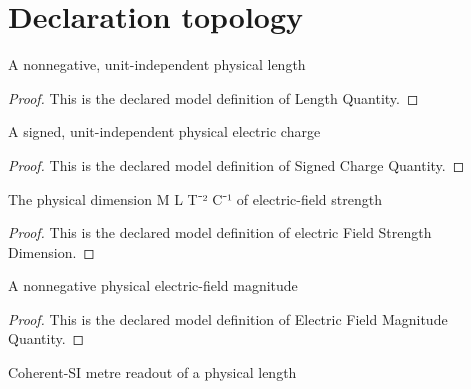 \section{Declaration topology}
\begin{definition}
  \label{def:physics:phyx-mini-0834:phyxminiproblems-problemphyxmini0834-lengthquantity}
  A nonnegative, unit-independent physical length
\end{definition}
\begin{proof}
  This is the declared model definition of Length Quantity.
\end{proof}
\begin{definition}
  \label{def:physics:phyx-mini-0834:phyxminiproblems-problemphyxmini0834-signedchargequantity}
  A signed, unit-independent physical electric charge
\end{definition}
\begin{proof}
  This is the declared model definition of Signed Charge Quantity.
\end{proof}
\begin{definition}
  \label{def:physics:phyx-mini-0834:phyxminiproblems-problemphyxmini0834-electricfieldstrengthdimension}
  The physical dimension M L T⁻² C⁻¹ of electric-field strength
\end{definition}
\begin{proof}
  This is the declared model definition of electric Field Strength Dimension.
\end{proof}
\begin{definition}
  \label{def:physics:phyx-mini-0834:phyxminiproblems-problemphyxmini0834-electricfieldmagnitudequantity}
  A nonnegative physical electric-field magnitude
\end{definition}
\begin{proof}
  This is the declared model definition of Electric Field Magnitude Quantity.
\end{proof}
\begin{definition}
  \label{def:physics:phyx-mini-0834:phyxminiproblems-problemphyxmini0834-lengthinmeters}
  Coherent-SI metre readout of a physical length
\end{definition}
